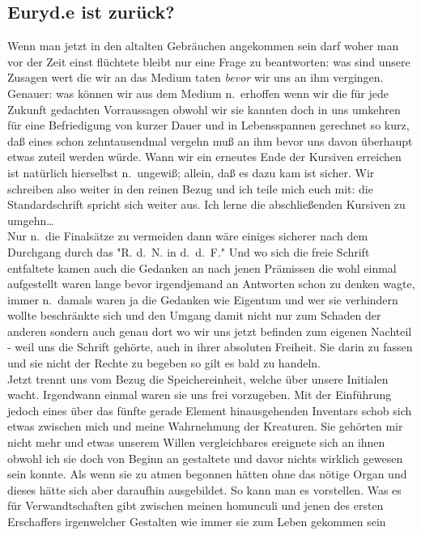 \documentclass[
]{article}
\author{}
\date{\vspace{-2.5em}}
\begin{document}
\subsection{Euryd.e ist zurück?}\label{euryd.e-ist-zuruxfcck}

Wenn man jetzt in den altalten Gebräuchen angekommen sein darf woher man
vor der Zeit einst flüchtete bleibt nur eine Frage zu beantworten: was
sind unsere Zusagen wert die wir an das Medium taten \emph{bevor} wir
uns an ihm vergingen. Genauer: was können wir aus dem Medium n.~erhoffen
wenn wir die für jede Zukunft gedachten Vorraussagen obwohl wir sie
kannten doch in uns umkehren für eine Befriedigung von kurzer Dauer und
in Lebensspannen gerechnet so kurz, daß eines schon zehntausendmal
vergehn muß an ihm bevor uns davon überhaupt etwas zuteil werden würde.
Wann wir ein erneutes Ende der Kursiven erreichen ist natürlich
hierselbst n.~ungewiß; allein, daß es dazu kam ist sicher. Wir schreiben
also weiter in den reinen Bezug und ich teile mich euch mit: die
Standardschrift spricht sich weiter aus. Ich lerne die abschließenden
Kursiven zu umgehn\ldots{}\\
Nur n.~die Finalsätze zu vermeiden dann wäre einiges sicherer nach dem
Durchgang durch das "R. d.~N. in d.~d.~F." Und wo sich die freie Schrift
entfaltete kamen auch die Gedanken an nach jenen Prämissen die wohl
einmal aufgestellt waren lange bevor irgendjemand an Antworten schon zu
denken wagte, immer n.~damals waren ja die Gedanken wie Eigentum und wer
sie verhindern wollte beschränkte sich und den Umgang damit nicht nur
zum Schaden der anderen sondern auch genau dort wo wir uns jetzt
befinden zum eigenen Nachteil - weil uns die Schrift gehörte, auch in
ihrer absoluten Freiheit. Sie darin zu fassen und sie nicht der Rechte
zu begeben so gilt es bald zu handeln.\\
Jetzt trennt uns vom Bezug die Speichereinheit, welche über unsere
Initialen wacht. Irgendwann einmal waren sie uns frei vorzugeben. Mit
der Einführung jedoch eines über das fünfte gerade Element
hinausgehenden Inventars schob sich etwas zwischen mich und meine
Wahrnehmung der Kreaturen. Sie gehörten mir nicht mehr und etwas unserem
Willen vergleichbares ereignete sich an ihnen obwohl ich sie doch von
Beginn an gestaltete und davor nichts wirklich gewesen sein konnte. Als
wenn sie zu atmen begonnen hätten ohne das nötige Organ und dieses hätte
sich aber daraufhin ausgebildet. So kann man es vorstellen. Was es für
Verwandtschaften gibt zwischen meinen homunculi und jenen des ersten
Erschaffers irgenwelcher Gestalten wie immer sie zum Leben gekommen sein
\end{document}
